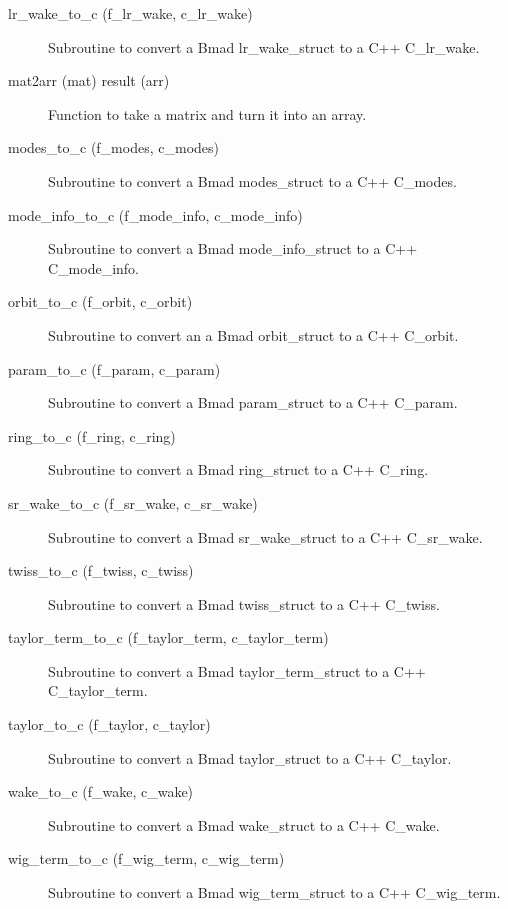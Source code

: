 \begin{description}
\item[lr\_wake\_to\_c (f\_lr\_wake, c\_lr\_wake)] \Newline 
Subroutine to convert a Bmad lr\_wake\_struct to a C++ C\_lr\_wake.

\item[mat2arr (mat) result (arr)] \Newline 
Function to take a matrix and turn it into an array.

\item[modes\_to\_c (f\_modes, c\_modes)] \Newline 
Subroutine to convert a Bmad modes\_struct to a C++ C\_modes.

\item[mode\_info\_to\_c (f\_mode\_info, c\_mode\_info)] \Newline 
Subroutine to convert a Bmad mode\_info\_struct to a C++ C\_mode\_info.

\item[orbit\_to\_c (f\_orbit, c\_orbit)] \Newline 
Subroutine to convert an a Bmad orbit\_struct to a C++ C\_orbit.

\item[param\_to\_c (f\_param, c\_param)] \Newline 
Subroutine to convert a Bmad param\_struct to a C++ C\_param.

\item[ring\_to\_c (f\_ring, c\_ring)] \Newline 
Subroutine to convert a Bmad ring\_struct to a C++ C\_ring.

\item[sr\_wake\_to\_c (f\_sr\_wake, c\_sr\_wake)] \Newline 
Subroutine to convert a Bmad sr\_wake\_struct to a C++ C\_sr\_wake.

\item[twiss\_to\_c (f\_twiss, c\_twiss)] \Newline 
Subroutine to convert a Bmad twiss\_struct to a C++ C\_twiss.

\item[taylor\_term\_to\_c (f\_taylor\_term, c\_taylor\_term)] \Newline 
Subroutine to convert a Bmad taylor\_term\_struct to a C++ C\_taylor\_term.

\item[taylor\_to\_c (f\_taylor, c\_taylor)] \Newline 
Subroutine to convert a Bmad taylor\_struct to a C++ C\_taylor.

\item[wake\_to\_c (f\_wake, c\_wake)] \Newline 
Subroutine to convert a Bmad wake\_struct to a C++ C\_wake.

\item[wig\_term\_to\_c (f\_wig\_term, c\_wig\_term)] \Newline 
Subroutine to convert a Bmad wig\_term\_struct to a C++ C\_wig\_term.

\end{description}

